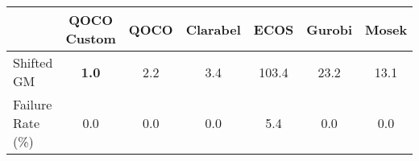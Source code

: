 \begin{tabular}{lcccccc}
  \hline
    & \textbf{QOCO Custom}   & \textbf{QOCO} & \textbf{Clarabel} & \textbf{ECOS} & \textbf{Gurobi} & \textbf{Mosek} \\ \hline
  Shifted GM & \textbf{1.0} & 2.2 & 3.4 & 103.4 & 23.2 & 13.1 \\ 
  Failure Rate (\%) & 0.0 & 0.0 & 0.0 & 5.4 & 0.0 & 0.0 \\ \hline 
\end{tabular}
